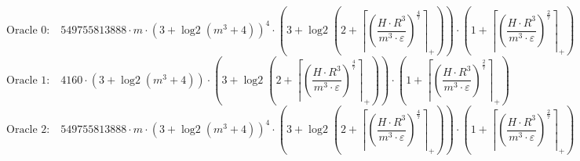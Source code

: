 \[\text{Oracle 0:}\quad 549755813888 \cdot m \cdot \left(3 + \operatorname{log2}\left(m^{3} + 4\right)\right)^{4} \cdot \left(3 + \operatorname{log2}\left(2 + \left\lceil \left(\frac{H \cdot R^{3}}{m^{3} \cdot \varepsilon}\right)^{\frac{4}{7}} \right\rceil_{+}\right)\right) \cdot \left(1 + \left\lceil \left(\frac{H \cdot R^{3}}{m^{3} \cdot \varepsilon}\right)^{\frac{2}{7}} \right\rceil_{+}\right)\]
\[\text{Oracle 1:}\quad 4160 \cdot \left(3 + \operatorname{log2}\left(m^{3} + 4\right)\right) \cdot \left(3 + \operatorname{log2}\left(2 + \left\lceil \left(\frac{H \cdot R^{3}}{m^{3} \cdot \varepsilon}\right)^{\frac{4}{7}} \right\rceil_{+}\right)\right) \cdot \left(1 + \left\lceil \left(\frac{H \cdot R^{3}}{m^{3} \cdot \varepsilon}\right)^{\frac{2}{7}} \right\rceil_{+}\right)\]
\[\text{Oracle 2:}\quad 549755813888 \cdot m \cdot \left(3 + \operatorname{log2}\left(m^{3} + 4\right)\right)^{4} \cdot \left(3 + \operatorname{log2}\left(2 + \left\lceil \left(\frac{H \cdot R^{3}}{m^{3} \cdot \varepsilon}\right)^{\frac{4}{7}} \right\rceil_{+}\right)\right) \cdot \left(1 + \left\lceil \left(\frac{H \cdot R^{3}}{m^{3} \cdot \varepsilon}\right)^{\frac{2}{7}} \right\rceil_{+}\right)\]
